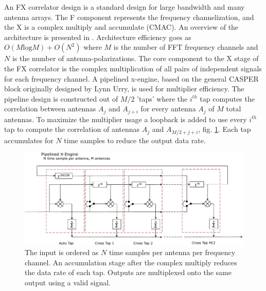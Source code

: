 \documentclass[useAMS,macros,usenatbib,onecolumn]{mn2e}
\begin{document}
An FX correlator design is a standard design for large bandwidth and many antenna arrays.
The F component represents the frequency channelization, and the X is a complex multiply and accumulate (CMAC).
An overview of the architecture is presented in \citep{casper}.
Architecture efficiency goes as $O( M \textrm{log} M) + O( N^2)$ where $M$ is the number of FFT frequency channels and $N$ is the number of antenna-polarizations.
The core component to the X stage of the FX correlator is the complex multiplication of all pairs of independent signals for each frequency channel.
A pipelined x-engine, based on the general CASPER block originally designed by Lynn Urry\citep{fxcorrelator}, is used for multiplier efficiency.
The pipeline design is constructed out of $M/2$ 'taps' where the $i^{th}$ tap computes the correlation between antennas $A_j$ and $A_{j+i}$ for every antenna $A_j$ of $M$ total antennas.
To maximize the multiplier usage a loopback is added to use every $i^{th}$ tap to compute the correlation of antennas $A_j$ and $A_{M/2+j+i}$, fig. \ref{fig:xeng_pipe}.
Each tap accumulates for $N$ time samples to reduce the output data rate.

\begin{figure}
    \centering
    \includegraphics[scale=0.6]{graphics/crop_pipelined_xeng.pdf}
    \caption{The input is ordered as $N$ time samples per antenna per frequency channel. An accumulation stage after the complex multiply reduces the data rate of each tap. Outputs are multiplexed onto the same output using a valid signal.}
    \label{fig:xeng_pipe}
\end{figure}
\end{document}
